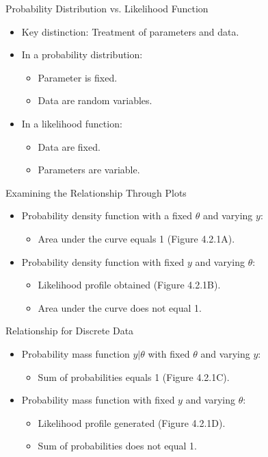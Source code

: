 

\begin{frame}{Probability Distribution vs. Likelihood Function}
  \begin{itemize}
    \item Key distinction: Treatment of parameters and data.
    \item In a probability distribution:
      \begin{itemize}
        \item Parameter is fixed.
        \item Data are random variables.
      \end{itemize}
    \item In a likelihood function:
      \begin{itemize}
        \item Data are fixed.
        \item Parameters are variable.
      \end{itemize}
  \end{itemize}
\end{frame}

\begin{frame}{Examining the Relationship Through Plots}
  \begin{itemize}
    \item Probability density function with a fixed $\theta$ and varying $y$:
      \begin{itemize}
        \item Area under the curve equals 1 (Figure 4.2.1A).
      \end{itemize}
    \item Probability density function with fixed $y$ and varying $\theta$:
      \begin{itemize}
        \item Likelihood profile obtained (Figure 4.2.1B).
        \item Area under the curve does not equal 1.
      \end{itemize}
  \end{itemize}
\end{frame}

\begin{frame}{Relationship for Discrete Data}
  \begin{itemize}
    \item Probability mass function $y|\theta$ with fixed $\theta$ and varying $y$:
      \begin{itemize}
        \item Sum of probabilities equals 1 (Figure 4.2.1C).
      \end{itemize}
    \item Probability mass function with fixed $y$ and varying $\theta$:
      \begin{itemize}
        \item Likelihood profile generated (Figure 4.2.1D).
        \item Sum of probabilities does not equal 1.
      \end{itemize}
  \end{itemize}
\end{frame}

